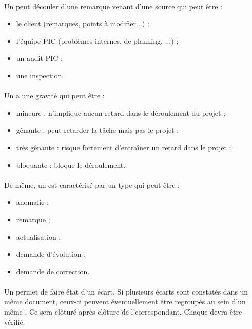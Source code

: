 \paragraph*{} Un \FT peut découler d'une remarque venant d'une source qui peut être :

\begin{itemize}
	\item le client (remarques, points à modifier...) ;
	\item l'équipe PIC (problèmes internes, de planning, ...) ;
	\item un audit PIC ;
	\item une inspection.
\end{itemize}

\paragraph*{} Un \FTCourt a une gravité qui peut être :
\begin{itemize}
\item mineure : n'implique aucun retard dans le déroulement du projet ;
\item gênante : peut retarder la tâche mais pas le projet ;
\item très gênante : risque fortement d'entraîner un retard dans le projet ;
\item bloquante : bloque le déroulement.
\end{itemize}

\paragraph*{} De même, un \FTCourt est caractérisé par un type qui peut être :
\begin{itemize}
\item anomalie ;
\item remarque ;
\item actualisation ;
\item demande d'évolution ;
\item demande de correction.
\end{itemize}

\paragraph*{} Un \FTCourt permet de faire état d'un écart. Si plusieurs écarts sont constatés dans un même
document, ceux-ci peuvent éventuellement être regroupés au sein d'un même \FTCourt . Ce \FTCourt sera
clôturé après clôture de l'\OCCourt correspondant. Chaque \OCCourt devra être vérifié.
